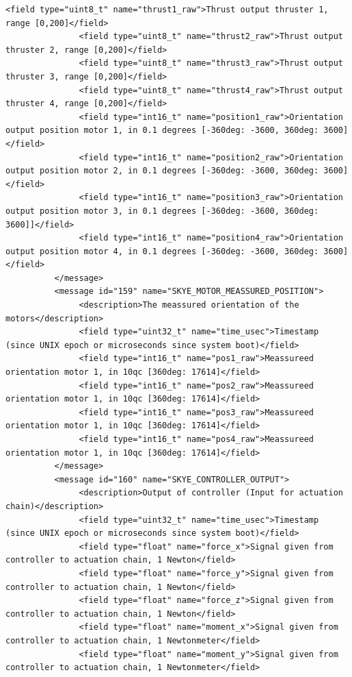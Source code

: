 \begin{lstlisting}[captionpos=b, caption="Definition of \textsc{Skye} specific Mavlink messages", label=app_xml]
               <field type="uint8_t" name="thrust1_raw">Thrust output thruster 1, range [0,200]</field>
               <field type="uint8_t" name="thrust2_raw">Thrust output thruster 2, range [0,200]</field>
               <field type="uint8_t" name="thrust3_raw">Thrust output thruster 3, range [0,200]</field>
               <field type="uint8_t" name="thrust4_raw">Thrust output thruster 4, range [0,200]</field>
               <field type="int16_t" name="position1_raw">Orientation output position motor 1, in 0.1 degrees [-360deg: -3600, 360deg: 3600]</field>
               <field type="int16_t" name="position2_raw">Orientation output position motor 2, in 0.1 degrees [-360deg: -3600, 360deg: 3600]</field>
               <field type="int16_t" name="position3_raw">Orientation output position motor 3, in 0.1 degrees [-360deg: -3600, 360deg: 3600]]</field>
               <field type="int16_t" name="position4_raw">Orientation output position motor 4, in 0.1 degrees [-360deg: -3600, 360deg: 3600]</field>
          </message>
          <message id="159" name="SKYE_MOTOR_MEASSURED_POSITION">
               <description>The meassured orientation of the motors</description>
               <field type="uint32_t" name="time_usec">Timestamp (since UNIX epoch or microseconds since system boot)</field>
               <field type="int16_t" name="pos1_raw">Meassureed orientation motor 1, in 10qc [360deg: 17614]</field>
               <field type="int16_t" name="pos2_raw">Meassureed orientation motor 1, in 10qc [360deg: 17614]</field>
               <field type="int16_t" name="pos3_raw">Meassureed orientation motor 1, in 10qc [360deg: 17614]</field>
               <field type="int16_t" name="pos4_raw">Meassureed orientation motor 1, in 10qc [360deg: 17614]</field>
          </message>
          <message id="160" name="SKYE_CONTROLLER_OUTPUT">
               <description>Output of controller (Input for actuation chain)</description>
               <field type="uint32_t" name="time_usec">Timestamp (since UNIX epoch or microseconds since system boot)</field>
               <field type="float" name="force_x">Signal given from controller to actuation chain, 1 Newton</field>
               <field type="float" name="force_y">Signal given from controller to actuation chain, 1 Newton</field>
               <field type="float" name="force_z">Signal given from controller to actuation chain, 1 Newton</field>
               <field type="float" name="moment_x">Signal given from controller to actuation chain, 1 Newtonmeter</field>
               <field type="float" name="moment_y">Signal given from controller to actuation chain, 1 Newtonmeter</field>

\end{lstlisting}
